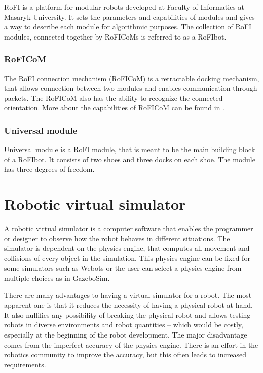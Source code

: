 \documentclass[
  digital, %
  table,   %
  oneside, %
  nolof,     %
  nolot,     %
]{fithesis3}
\begin{document}
RoFI is a platform for modular robots developed at Faculty of Informatics at Masaryk University.
It sets the parameters and capabilities of modules and gives a way to describe each module for algorithmic purposes.
The collection of RoFI modules, connected together by RoFICoMs is referred to as a RoFIbot\label{rofibot}.


\subsection{RoFICoM}
\label{roficom}

The RoFI connection mechanism (RoFICoM) is a retractable docking mechanism, that allows connection between two modules and enables communication through packets.
The RoFICoM also has the ability to recognize the connected orientation.
More about the capabilities of RoFICoM can be found in \cite{roficom}.


\subsection{Universal module}
\label{univ-module}

Universal module is a RoFI module, that is meant to be the main building block of a RoFIbot.
It consists of two shoes and three docks on each shoe.
The module has three degrees of freedom.


\chapter{Robotic virtual simulator}

A robotic virtual simulator is a computer software that enables the programmer or designer to observe how the robot behaves in different situations.
The simulator is dependent on the physics engine, that computes all movement and collisions of every object in the simulation.
This physics engine can be fixed for some simulators such as Webots\cite{webots} or the user can select a physics engine from multiple choices as in GazeboSim\cite{gazebo}.

There are many advantages to having a virtual simulator for a robot.
The most apparent one is that it reduces the necessity of having a physical robot at hand.
It also nullifies any possibility of breaking the physical robot and allows testing robots in diverse environments and robot quantities -- which would be costly, especially at the beginning of the robot development.
The major disadvantage comes from the imperfect accuracy of the physics engine. There is an effort in the robotics community to improve the accuracy, but this often leads to increased requirements.
\end{document}
